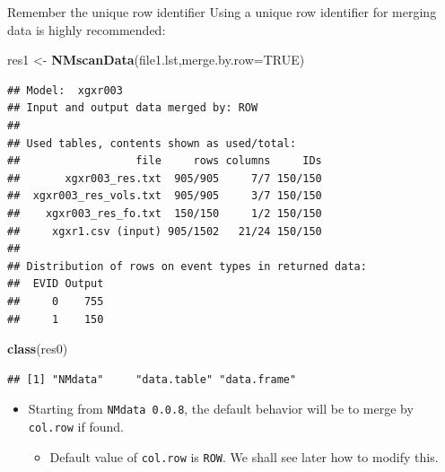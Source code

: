 \documentclass[
  8pt,
  ignorenonframetext,
  aspectratio=169]{beamer}
\newenvironment{Shaded}{\begin{snugshade}}{\end{snugshade}}
\newcommand{\DataTypeTok}[1]{\textcolor[rgb]{0.13,0.29,0.53}{#1}}
\newcommand{\KeywordTok}[1]{\textcolor[rgb]{0.13,0.29,0.53}{\textbf{#1}}}
\newcommand{\NormalTok}[1]{#1}
\newcommand{\OtherTok}[1]{\textcolor[rgb]{0.56,0.35,0.01}{#1}}
\newcommand{\StringTok}[1]{\textcolor[rgb]{0.31,0.60,0.02}{#1}}
\providecommand{\tightlist}{%
  \setlength{\itemsep}{0pt}\setlength{\parskip}{0pt}}
\begin{document}
\begin{frame}[fragile]{Remember the unique row identifier}
\protect\hypertarget{remember-the-unique-row-identifier}{}
Using a unique row identifier for merging data is highly recommended:

\footnotesize

\begin{Shaded}
\begin{Highlighting}[]
\NormalTok{res1 \textless{}{-}}\StringTok{ }\KeywordTok{NMscanData}\NormalTok{(file1.lst,}\DataTypeTok{merge.by.row=}\OtherTok{TRUE}\NormalTok{)}
\end{Highlighting}
\end{Shaded}

\begin{verbatim}
## Model:  xgxr003 
## Input and output data merged by: ROW 
## 
## Used tables, contents shown as used/total:
##                  file     rows columns     IDs
##       xgxr003_res.txt  905/905     7/7 150/150
##  xgxr003_res_vols.txt  905/905     3/7 150/150
##    xgxr003_res_fo.txt  150/150     1/2 150/150
##     xgxr1.csv (input) 905/1502   21/24 150/150
## 
## Distribution of rows on event types in returned data:
##  EVID Output
##     0    755
##     1    150
\end{verbatim}

\begin{Shaded}
\begin{Highlighting}[]
\KeywordTok{class}\NormalTok{(res0)}
\end{Highlighting}
\end{Shaded}

\begin{verbatim}
## [1] "NMdata"     "data.table" "data.frame"
\end{verbatim}

\normalsize

\begin{itemize}
\tightlist
\item
  Starting from \texttt{NMdata\ 0.0.8}, the default behavior will be to
  merge by \texttt{col.row} if found.

  \begin{itemize}
  \tightlist
  \item
    Default value of \texttt{col.row} is \texttt{ROW}. We shall see
    later how to modify this.
  \end{itemize}
\end{itemize}
\end{frame}
\end{document}
